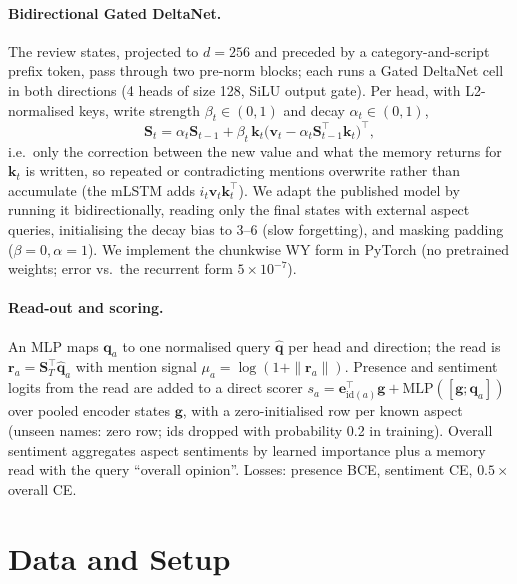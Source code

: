\documentclass[11pt]{article}
\begin{document}
\paragraph{Bidirectional Gated DeltaNet.} The review states, projected to $d{=}256$ and preceded by a
category-and-script prefix token, pass through two pre-norm blocks; each runs a Gated DeltaNet cell in
both directions (4 heads of size 128, SiLU output gate). Per head, with L2-normalised keys, write
strength $\beta_t\in(0,1)$ and decay $\alpha_t\in(0,1)$,
\begin{equation}
\mathbf{S}_t = \alpha_t\mathbf{S}_{t-1} + \beta_t\,\mathbf{k}_t\big(\mathbf{v}_t - \alpha_t\mathbf{S}_{t-1}^\top\mathbf{k}_t\big)^\top ,
\end{equation}
i.e.\ only the correction between the new value and what the memory returns for $\mathbf{k}_t$ is
written, so repeated or contradicting mentions overwrite rather than accumulate (the mLSTM adds
$i_t\mathbf{v}_t\mathbf{k}_t^\top$). We adapt the published model by running it bidirectionally,
reading only the final states with external aspect queries, initialising the decay bias to 3--6 (slow
forgetting), and masking padding ($\beta{=}0,\alpha{=}1$). We implement the chunkwise WY form in
PyTorch (no pretrained weights; error vs.\ the recurrent form $5\times10^{-7}$).

\paragraph{Read-out and scoring.} An MLP maps $\mathbf{q}_a$ to one normalised query $\hat{\mathbf{q}}$
per head and direction; the read is $\mathbf{r}_a=\mathbf{S}_T^\top\hat{\mathbf{q}}_a$ with mention
signal $\mu_a=\log(1+\|\mathbf{r}_a\|)$. Presence and sentiment logits from the read are added to a
direct scorer $s_a=\mathbf{e}_{\mathrm{id}(a)}^\top\mathbf{g}+\mathrm{MLP}([\mathbf{g};\mathbf{q}_a])$ over
pooled encoder states $\mathbf{g}$, with a zero-initialised row per known aspect (unseen names: zero
row; ids dropped with probability 0.2 in training). Overall sentiment aggregates aspect sentiments by
learned importance plus a memory read with the query ``overall opinion''. Losses: presence BCE, sentiment
CE, $0.5\times$ overall CE.

\section{Data and Setup}
\end{document}
